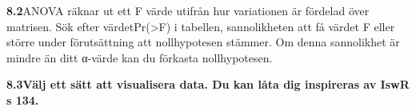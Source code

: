 \documentclass[
  letterpaper,
  DIV=11,
  numbers=noendperiod]{scrartcl}
\begin{document}
\textbf{8.2}ANOVA räknar ut ett F värde utifrån hur variationen är
fördelad över matrisen. Sök efter värdetPr(\textgreater F) i tabellen,
sannolikheten att få värdet F eller större under förutsättning att
nollhypotesen stämmer. Om denna sannolikhet är mindre än ditt α-värde
kan du förkasta nollhypotesen.

\textbf{8.3Välj ett sätt att visualisera data. Du kan låta dig
inspireras av IswR s 134.}
\end{document}
